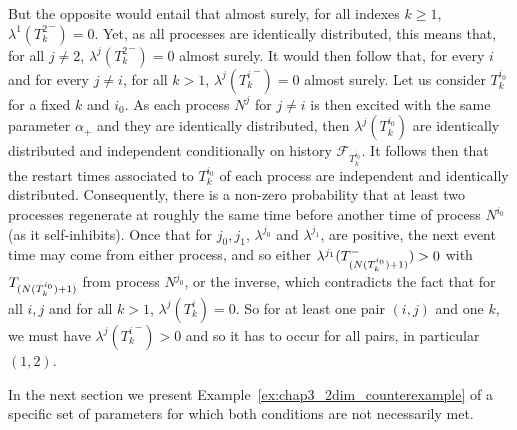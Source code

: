 \begin{example}
        But the opposite would entail that almost surely, for all indexes \(k\ge1\), $\lambda^1({T_k^2}^-) = 0$.
        Yet, as all processes are identically distributed,
        this means that, for all $j\neq 2$, \(\lambda^j({T_k^2}^-) = 0\) almost surely.
        It would then follow that, for every $i$ and for every $j\neq i$, for all $k> 1$, $\lambda^j({T_k^i}^-) = 0$ almost surely. Let us consider $T_k^{i_0}$ for a fixed $k$ and $i_0$. As each process $N^j$ for $j\neq i$ is then excited with the same parameter $\alpha_+$ and they are identically distributed, then $\lambda^j(T_k^{i_0})$ are identically distributed and independent conditionally on history $\mathcal{F}_{T_k^{i_0}}$. It follows then that the restart times associated to $T_k^{i_0}$ of each process are independent and identically distributed. Consequently, there is a non-zero probability that at least two processes regenerate at roughly the same time before another time of process $N^{i_0}$ (as it self-inhibits). Once that for $j_0, j_1$, $\lambda^{j_0}$ and $\lambda^{j_1}$, are positive, the next event time may come from either process, and so either $\lambda^{j_1}(T\park[N(T_k^{i_0}) + 1]^-) > 0$ with $T\park[N(T_k^{i_0}) + 1]$ from process $N^{j_0}$, or the inverse, which contradicts the fact that for all $i,j$ and for all $k>1$, $\lambda^j(T_k^i) = 0$.
        So for at least one pair $(i, j)$ and one $k$, we must have $\lambda^{j}({T_k^{i}}^-) > 0$ and so it has to occur for all pairs, in particular $(1, 2)$.

    \end{example}

    In the next section we present Example~\ref{ex:chap3_2dim_counterexample} of a specific set of parameters for which both conditions are not necessarily met.

